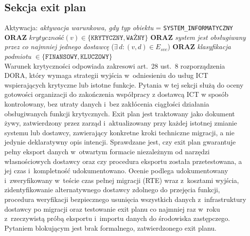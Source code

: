 \subsection{Sekcja exit plan}
\noindent Aktywacja: \textit{aktywacja warunkowa, gdy typ obiektu} = \texttt{SYSTEM\_INFORMATYCZNY} \textbf{ORAZ} $\textit{krytyczność}(v) \in \{\texttt{KRYTYCZNY}, \texttt{WAŻNY}\}$ \textbf{ORAZ} \textit{system jest obsługiwany przez co najmniej jednego dostawcę} ($\exists\, d : (v, d) \in E_{svc}$) \textbf{ORAZ} \textit{klasyfikacja podmiotu} $\in \{\texttt{FINANSOWY}, \texttt{KLUCZOWY}\}$\\
Warunek krytyczności odpowiada zakresowi art.~28 ust.~8 rozporządzenia DORA, który wymaga strategii wyjścia w~odniesieniu do usług ICT wspierających krytyczne lub istotne funkcje. Pytania w tej sekcji służą do oceny gotowości organizacji do zakończenia współpracy z dostawcą ICT w sposób kontrolowany, bez utraty danych i~bez zakłócenia ciągłości działania obsługiwanych funkcji krytycznych. Exit plan jest traktowany jako dokument żywy, zatwierdzony przez zarząd i~aktualizowany przy każdej istotnej zmianie systemu lub dostawcy, zawierający konkretne kroki techniczne migracji, a nie jedynie deklaratywny opis intencji. Sprawdzane jest, czy exit plan gwarantuje pełny eksport danych w~otwartym formacie niezależnym od narzędzi własnościowych dostawcy oraz czy procedura eksportu została przetestowana, a jej czas i~kompletność udokumentowano. Ocenie podlega udokumentowany i~zweryfikowany w~teście czas pełnej migracji (RTE) wraz z~kosztami wyjścia, zidentyfikowanie alternatywnego dostawcy zdolnego do przejęcia funkcji, procedura weryfikacji bezpiecznego usunięcia wszystkich danych z~infrastruktury dostawcy po migracji oraz testowanie exit planu co najmniej raz w~roku z~rzeczywistą próbą eksportu i~importu danych do środowiska zastępczego. Pytaniem blokującym jest brak formalnego, zatwierdzonego exit planu.

